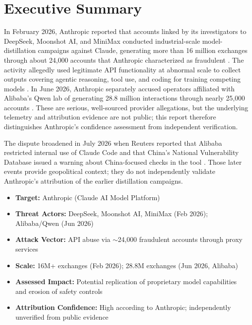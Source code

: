 \documentclass[11pt,a4paper]{article}
\begin{document}
\newpage
\tableofcontents
\newpage

\section{Executive Summary}

In February 2026, Anthropic reported that accounts linked by its investigators to DeepSeek, Moonshot AI, and MiniMax conducted industrial-scale model-distillation campaigns against Claude, generating more than 16 million exchanges through about 24,000 accounts that Anthropic characterized as fraudulent \cite{anthropic_blog}\cite{techcrunch}. The activity allegedly used legitimate API functionality at abnormal scale to collect outputs covering agentic reasoning, tool use, and coding for training competing models \cite{anthropic_blog}\cite{engadget}. In June 2026, Anthropic separately accused operators affiliated with Alibaba's Qwen lab of generating 28.8 million interactions through nearly 25,000 accounts \cite{reuters_alibaba}\cite{forbes_distillation}. These are serious, well-sourced provider allegations, but the underlying telemetry and attribution evidence are not public; this report therefore distinguishes Anthropic's confidence assessment from independent verification.

The dispute broadened in July 2026 when Reuters reported that Alibaba restricted internal use of Claude Code and that China's National Vulnerability Database issued a warning about China-focused checks in the tool \cite{indiatoday_alibaba}\cite{scmp_claudecode}. Those later events provide geopolitical context; they do not independently validate Anthropic's attribution of the earlier distillation campaigns.

\begin{tcolorbox}[colback=lightblue, colframe=headerblue, boxrule=1pt, arc=2pt, sharp corners=south, title=\textbf{Key Facts at a Glance}]
\begin{itemize}[leftmargin=20pt, noitemsep, nosep]
    \item \textbf{Target:} Anthropic (Claude AI Model Platform)
    \item \textbf{Threat Actors:} DeepSeek, Moonshot AI, MiniMax (Feb 2026); Alibaba/Qwen (Jun 2026)
    \item \textbf{Attack Vector:} API abuse via $\sim$24,000 fraudulent accounts through proxy services
    \item \textbf{Scale:} 16M+ exchanges (Feb 2026); 28.8M exchanges (Jun 2026, Alibaba)
    \item \textbf{Assessed Impact:} Potential replication of proprietary model capabilities and erosion of safety controls
    \item \textbf{Attribution Confidence:} High according to Anthropic; independently unverified from public evidence
\end{itemize}
\end{tcolorbox}
\end{document}
